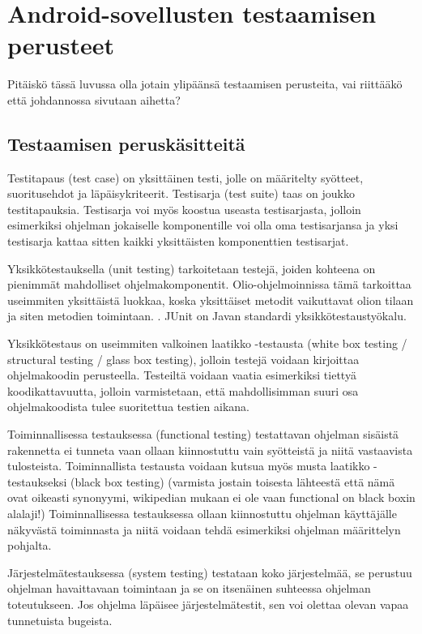 \section{Android-sovellusten testaamisen perusteet}

Pitäiskö tässä luvussa olla jotain ylipäänsä testaamisen perusteita, vai riittääkö että johdannossa sivutaan aihetta?

\subsection{Testaamisen peruskäsitteitä}

Testitapaus (test case) on yksittäinen testi, jolle on määritelty syötteet, suoritusehdot ja läpäisykriteerit. Testisarja (test suite) taas on joukko testitapauksia. Testisarja voi myös koostua useasta testisarjasta, jolloin esimerkiksi ohjelman jokaiselle komponentille voi olla oma testisarjansa ja yksi testisarja kattaa sitten kaikki yksittäisten komponenttien testisarjat. \cite[153]{testing}

Yksikkötestauksella (unit testing) tarkoitetaan testejä, joiden kohteena on pienimmät mahdolliset ohjelmakomponentit. Olio-ohjelmoinnissa tämä tarkoittaa useimmiten yksittäistä luokkaa, koska yksittäiset metodit vaikuttavat olion tilaan ja siten metodien toimintaan. \cite[282-286]{testing}. JUnit\cite{junit} on Javan standardi yksikkötestaustyökalu.

Yksikkötestaus on useimmiten valkoinen laatikko -testausta (white box testing / structural testing / glass box testing), jolloin testejä voidaan kirjoittaa ohjelmakoodin perusteella. Testeiltä voidaan vaatia esimerkiksi tiettyä koodikattavuutta, jolloin varmistetaan, että mahdollisimman suuri osa ohjelmakoodista tulee suoritettua testien aikana.\cite[154]{testing}

Toiminnallisessa testauksessa (functional testing) testattavan ohjelman sisäistä rakennetta ei tunneta vaan ollaan kiinnostuttu vain syötteistä ja niitä vastaavista tulosteista. Toiminnallista testausta voidaan kutsua myös musta laatikko -testaukseksi (black box testing) (varmista jostain toisesta lähteestä että nämä ovat oikeasti synonyymi, wikipedian mukaan ei ole vaan functional on black boxin alalaji!) Toiminnallisessa testauksessa ollaan kiinnostuttu ohjelman käyttäjälle näkyvästä toiminnasta ja niitä voidaan tehdä esimerkiksi ohjelman määrittelyn pohjalta.\cite[161-162]{testing}

Järjestelmätestauksessa (system testing) testataan koko järjestelmää, se perustuu ohjelman havaittavaan toimintaan ja se on itsenäinen suhteessa ohjelman toteutukseen. Jos ohjelma läpäisee järjestelmätestit, sen voi olettaa olevan vapaa tunnetuista bugeista.\cite[418-421]{testing}

